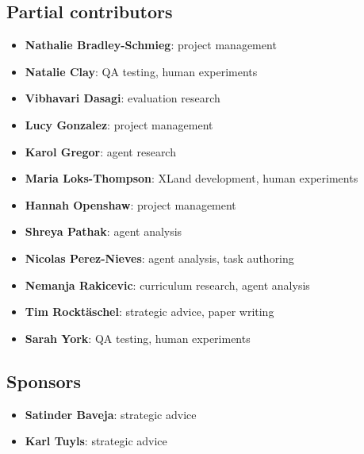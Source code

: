 \documentclass[11pt, a4paper, logo, copyright]{deepmind}
\begin{document}
\subsection{Partial contributors}
\begin{itemize}
    \item \textbf{Nathalie Bradley-Schmieg}: project management
    \item \textbf{Natalie Clay}: QA testing, human experiments
    \item \textbf{Vibhavari Dasagi}: evaluation research
    \item \textbf{Lucy Gonzalez}: project management
    \item \textbf{Karol Gregor}: agent research
    \item \textbf{Maria Loks-Thompson}: XLand development, human experiments
    \item \textbf{Hannah Openshaw}: project management
    \item \textbf{Shreya Pathak}: agent analysis
    \item \textbf{Nicolas Perez-Nieves}: agent analysis, task authoring
    \item \textbf{Nemanja Rakicevic}: curriculum research, agent analysis
    \item \textbf{Tim Rockt\"aschel}: strategic advice, paper writing
    \item \textbf{Sarah York}: QA testing, human experiments
\end{itemize}
\subsection{Sponsors}
\begin{itemize}
    \item \textbf{Satinder Baveja}: strategic advice
    \item \textbf{Karl Tuyls}: strategic advice
\end{itemize}
\end{document}
